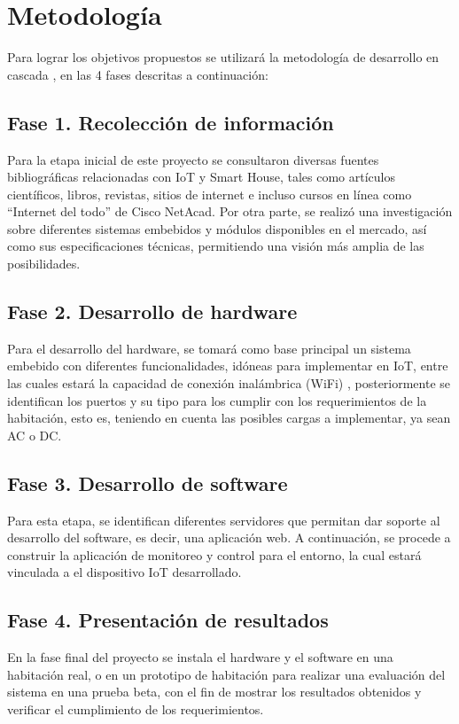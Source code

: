 \chapter{Metodología}

Para lograr los objetivos propuestos se utilizará la metodología de desarrollo en cascada \cite{Moha}, en las 4 fases descritas a continuación:

\section{Fase 1. Recolección de información} 
	Para la etapa inicial de este proyecto se consultaron diversas fuentes bibliográficas relacionadas con IoT y Smart House, tales como artículos científicos, libros, revistas, sitios de internet e incluso cursos en línea como “Internet del todo” de Cisco NetAcad. Por otra parte, se realizó una investigación sobre diferentes sistemas embebidos y módulos disponibles en el mercado, así como sus especificaciones técnicas, permitiendo una visión más amplia de las posibilidades. \\

\section{Fase 2. Desarrollo de hardware}
	Para el desarrollo del hardware, se tomará como base principal un sistema embebido con diferentes funcionalidades, idóneas para implementar en IoT, entre las cuales estará la capacidad de conexión inalámbrica (WiFi) , posteriormente se identifican los puertos y su tipo para los cumplir con los requerimientos de la habitación, esto es, teniendo en cuenta las posibles cargas a implementar, ya sean AC o DC. \\

\section{Fase 3. Desarrollo de software}
	Para esta etapa, se identifican diferentes servidores que permitan dar soporte al desarrollo del software, es decir, una aplicación web. A continuación, se procede a construir la aplicación de monitoreo y control para el entorno, la cual estará vinculada a el dispositivo IoT desarrollado.\\

\section{Fase 4. Presentación de resultados} 
	En la fase final del proyecto se instala el hardware y el software en una habitación real, o en un prototipo de habitación para realizar una evaluación del sistema en una prueba beta, con el fin de mostrar los resultados obtenidos y verificar el cumplimiento de los requerimientos.\\